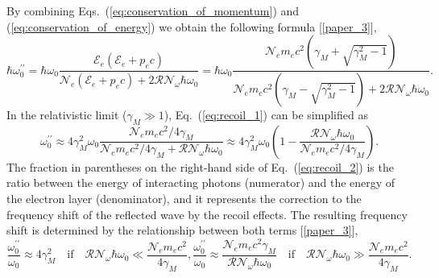 \documentclass[10pt, a4paper, twoside, openright]{report}
\begin{document}
By combining Eqs.~(\ref{eq:conservation_of_momentum}) and (\ref{eq:conservation_of_energy}) we obtain the following formula [\ref{paper_3}],
\begin{equation}\label{eq:recoil_1}
\hbar \omega_0^{\prime \prime} = \hbar \omega_0 \frac{\mathcal{E}_e \left( \mathcal{E}_e + p_e c \right)}{\mathcal{N}_e \left( \mathcal{E}_e + p_e c \right) + 2 \mathcal{R} \mathcal{N}_{\omega} \hbar \omega_0} = \hbar \omega_0 \frac{\mathcal{N}_e m_e c^2 \left( \gamma_M + \sqrt{\gamma_M^2 - 1} \right)}{\mathcal{N}_e m_e c^2 \left( \gamma_M - \sqrt{\gamma_M^2 - 1} \right) + 2 \mathcal{R} \mathcal{N}_{\omega} \hbar \omega_0}.
\end{equation}
In the relativistic limit ($ \gamma_M \gg 1 $), Eq.~(\ref{eq:recoil_1}) can be simplified as
\begin{equation}\label{eq:recoil_2}
\omega_0^{\prime \prime} \approx 4 \gamma_M^2 \omega_0 \frac{\mathcal{N}_e m_e c^2 / 4 \gamma_M}{\mathcal{N}_e m_e c^2 / 4 \gamma_M + \mathcal{R} \mathcal{N}_{\omega} \hbar \omega_0} \approx 4 \gamma_M^2 \omega_0 \left( 1 - \frac{\mathcal{R} \mathcal{N}_{\omega} \hbar \omega_0}{\mathcal{N}_e m_e c^2 / 4 \gamma_M} \right).
\end{equation}
The fraction in parentheses on the right-hand side of Eq.~(\ref{eq:recoil_2}) is the ratio between the energy of interacting photons (numerator) and the energy of the electron layer (denominator), and it represents the correction to the frequency shift of the reflected wave by the recoil effects. The resulting frequency shift is determined by the relationship between both terms [\ref{paper_3}],
\begin{subequations}
\begin{equation}\label{eq:recoil_limit_1}
\frac{\omega_0^{\prime \prime}}{\omega_0} \approx 4 \gamma_M^2 \quad \mathrm{if} \quad \mathcal{R} \mathcal{N}_{\omega} \hbar \omega_0 \ll \frac{\mathcal{N}_e m_e c^2}{4 \gamma_M},
\end{equation}
\begin{equation}\label{eq:recoil_limit_2}
\frac{\omega_0^{\prime \prime}}{\omega_0} \approx \frac{\mathcal{N}_e m_e c^2 \gamma_M}{\mathcal{R} \mathcal{N}_{\omega} \hbar  \omega_0} \quad \mathrm{if} \quad \mathcal{R} \mathcal{N}_{\omega} \hbar \omega_0 \gg \frac{\mathcal{N}_e m_e c^2}{4 \gamma_M}. 
\end{equation}
\end{subequations}
\end{document}

